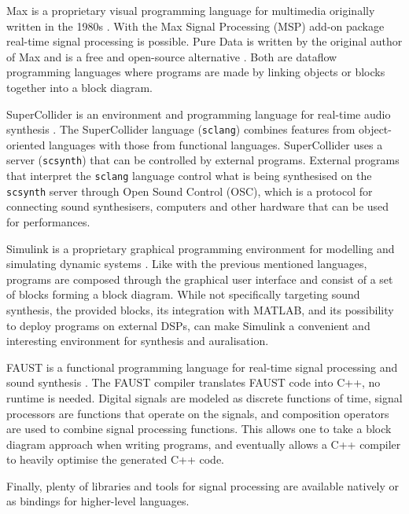 Max is a proprietary visual programming language for multimedia originally
written in the 1980s \cite{Max2017}. With the Max Signal Processing (MSP) add-on
package real-time signal processing is possible. Pure Data is written by the
original author of Max and is a free and open-source alternative
\cite{PureData2017}. Both are dataflow programming languages where programs are
made by linking objects or blocks together into a block diagram.

SuperCollider is an environment and programming language for real-time audio
synthesis \cite{SuperCollider2017} . The SuperCollider language
(\texttt{sclang}) combines features from object-oriented languages with
those from functional languages. SuperCollider uses a server
(\texttt{scsynth}) that can be controlled by external programs. External
programs that interpret the \texttt{sclang} language control what is
being synthesised on the \texttt{scsynth} server through Open Sound
Control (OSC), which is a protocol for connecting sound synthesisers, computers
and other hardware that can be used for performances.

Simulink is a proprietary graphical programming environment for modelling and
simulating dynamic systems \cite{Simulink2017}. Like with the previous mentioned
languages, programs are composed through the graphical user interface and
consist of a set of blocks forming a block diagram. While not specifically
targeting sound synthesis, the provided blocks, its integration with MATLAB,
and its possibility to deploy programs on external DSPs, can make Simulink a
convenient and interesting environment for synthesis and auralisation.


FAUST is a functional programming language for real-time signal processing and
sound synthesis \cite{Faust2017}. The FAUST compiler translates FAUST code into
C++, no runtime is needed. Digital signals are modeled as discrete functions of
time, signal processors are functions that operate on the signals, and
composition operators are used to combine signal processing functions.
This allows one to take a block diagram approach when writing programs, and
eventually allows a C++ compiler to heavily optimise the generated C++ code.

Finally, plenty of libraries and tools for signal processing are available natively or as bindings
for higher-level languages.




